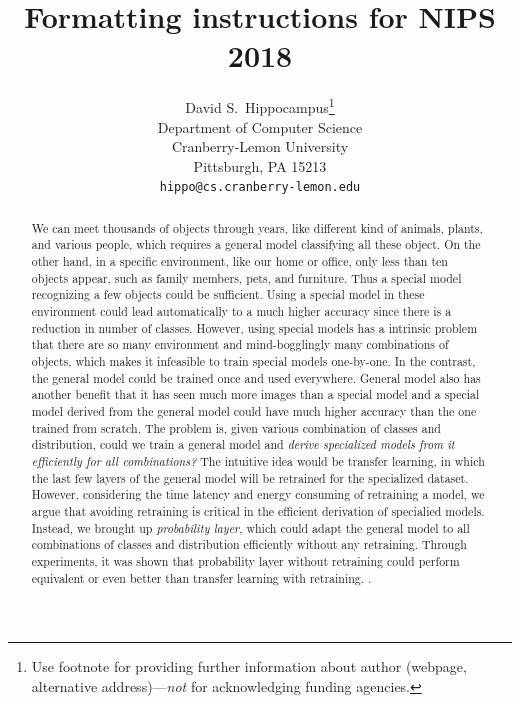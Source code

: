 \documentclass{article}
\title{Formatting instructions for NIPS 2018}
\author{
  David S.~Hippocampus\thanks{Use footnote for providing further
    information about author (webpage, alternative
    address)---\emph{not} for acknowledging funding agencies.} \\
  Department of Computer Science\\
  Cranberry-Lemon University\\
  Pittsburgh, PA 15213 \\
  \texttt{hippo@cs.cranberry-lemon.edu} \\
}
\begin{document}

\maketitle


\begin{abstract}
{\color{blue}
  We can meet thousands of objects through years, like different kind of animals, plants, and various people, which requires a general model classifying all these object. On the other hand, in a specific environment, like our home or office, only less than ten objects appear, such as family members, pets, and furniture. Thus a special model recognizing a few objects could be sufficient. Using a special model in these environment could lead automatically to a much higher accuracy since there is a reduction in number of classes. However, using special models has a intrinsic problem that there are so many environment and mind-bogglingly many combinations of objects, which makes it infeasible to train special models one-by-one. In the contrast, the general model could be trained once and used everywhere. General model also has another benefit that it has seen much more images than a special model and a special model derived from the general model could have much higher accuracy than the one trained from scratch. The problem is, given various combination of classes and distribution, could we train a general model and \textit{derive specialized models from it efficiently for all combinations?} The intuitive idea would be transfer learning, in which the last few layers of the general model will be retrained for the specialized dataset. However, considering the time latency and energy consuming of retraining a model, we argue that avoiding retraining is critical in the efficient derivation of specialied models. Instead, we brought up \textit{probability layer}, which could adapt the general model to all combinations of classes and distribution efficiently without any retraining. Through experiments, it was shown that probability layer without retraining could perform equivalent or even better than transfer learning with retraining.}
  .
\end{abstract}
\end{document}
